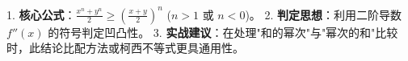 \begin{summarybox}
1. \textbf{核心公式}：$\frac{x^n + y^n}{2} \geqslant \left(\frac{x+y}{2}\right)^n$ ($n>1$ 或 $n<0$)。
2. \textbf{判定思想}：利用二阶导数 $f''(x)$ 的符号判定凹凸性。
3. \textbf{实战建议}：在处理"和的幂次"与"幂次的和"比较时，此结论比配方法或柯西不等式更具通用性。
\end{summarybox}
